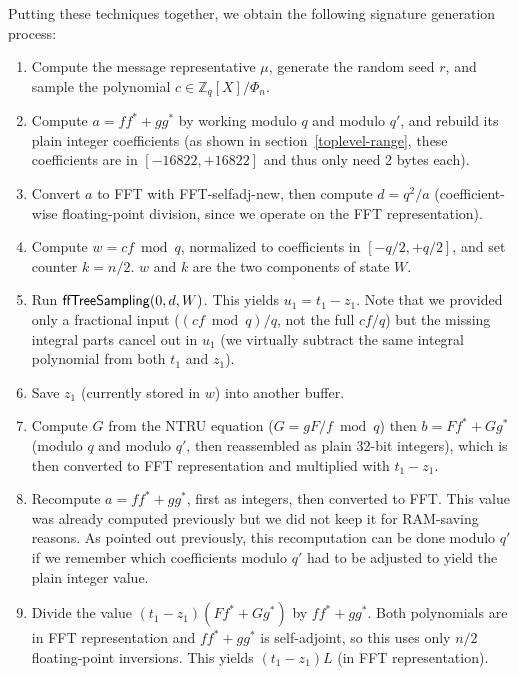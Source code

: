 \documentclass{llncs}
\newcommand{\bZ}{\mathbb{Z}}
\newcommand{\adj}[1]{{#1}^*}
\begin{document}
Putting these techniques together, we obtain the following signature
generation process:
\begin{enumerate}
    \item Compute the message representative $\mu$, generate the random
    seed $r$, and sample the polynomial $c\in \bZ_q[X]/\Phi_n$.

    \item Compute $a = f\adj{f} + g\adj{g}$ by working modulo $q$ and
    modulo $q'$, and rebuild its plain integer coefficients (as
    shown in section~\ref{toplevel-range}, these coefficients are
    in $[-16822, +16822]$ and thus only need 2 bytes each).

    \item Convert $a$ to FFT with \textsf{FFT-selfadj-new}, then
    compute $d = q^2/a$ (coefficient-wise floating-point division, since
    we operate on the FFT representation).

    \item Compute $w = cf \bmod q$, normalized to coefficients in
    $[-q/2, +q/2]$, and set counter $k = n/2$. $w$ and $k$ are the
    two components of state $W$.

    \item Run $\text{\textsf{ffTreeSampling}}(0, d, W)$. This yields
    $u_1 = t_1 - z_1$. Note that we provided only a fractional input
    ($(cf \bmod q)/q$, not the full $cf/q$) but the missing integral
    parts cancel out in $u_1$ (we virtually subtract the same integral
    polynomial from both $t_1$ and $z_1$).

    \item Save $z_1$ (currently stored in $w$) into another buffer.

    \item Compute $G$ from the NTRU equation ($G = gF/f \bmod q$) then
    $b = F\adj{f} + G\adj{g}$ (modulo $q$ and modulo $q'$, then
    reassembled as plain 32-bit integers), which is then converted to
    FFT representation and multiplied with $t_1 - z_1$.

    \item Recompute $a = f\adj{f} + g\adj{g}$, first as integers, then
    converted to FFT. This value was already computed previously but we
    did not keep it for RAM-saving reasons. As pointed out previously,
    this recomputation can be done modulo $q'$ if we remember which
    coefficients modulo $q'$ had to be adjusted to yield the plain
    integer value.

    \item Divide the value $(t_1 - z_1)(F\adj{f} + G\adj{g})$ by
    $f\adj{f} + g\adj{g}$. Both polynomials are in FFT representation
    and $f\adj{f} + g\adj{g}$ is self-adjoint, so this uses only
    $n/2$ floating-point inversions. This yields $(t_1 - z_1)L$ (in FFT
    representation).


\end{enumerate}
\end{document}
